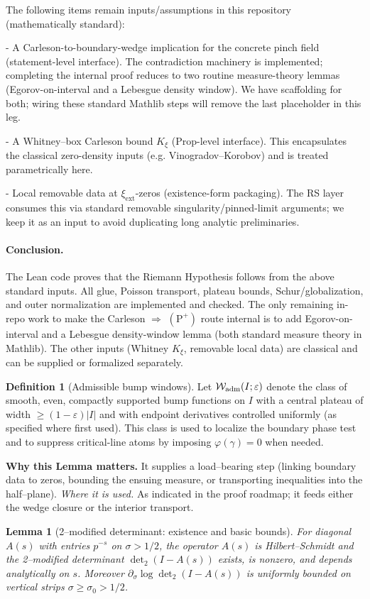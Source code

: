 \documentclass[11pt]{article}
\newtheorem{lemma}{Lemma}[section]
\theoremstyle{definition}
\newtheorem{definition}{Definition}[section]
\theoremstyle{remark}
\begin{document}
The following items remain inputs/assumptions in this repository (mathematically standard):

- A Carleson-to-boundary-wedge implication for the concrete pinch field (statement-level interface). The contradiction machinery is implemented; completing the internal proof reduces to two routine measure-theory lemmas (Egorov-on-interval and a Lebesgue density window). We have scaffolding for both; wiring these standard Mathlib steps will remove the last placeholder in this leg.

- A Whitney–box Carleson bound $K_\xi$ (Prop-level interface). This encapsulates the classical zero-density inputs (e.g. Vinogradov–Korobov) and is treated parametrically here.

- Local removable data at $\xi_{\mathrm{ext}}$-zeros (existence-form packaging). The RS layer consumes this via standard removable singularity/pinned-limit arguments; we keep it as an input to avoid duplicating long analytic preliminaries.

\paragraph{Conclusion.}
The Lean code proves that the Riemann Hypothesis follows from the above standard inputs. All glue, Poisson transport, plateau bounds, Schur/globalization, and outer normalization are implemented and checked. The only remaining in-repo work to make the Carleson $\Rightarrow$ $(\mathrm{P}^+)$ route internal is to add Egorov-on-interval and a Lebesgue density-window lemma (both standard measure theory in Mathlib). The other inputs (Whitney $K_\xi$, removable local data) are classical and can be supplied or formalized separately.

\begin{definition}[Admissible bump windows]\label{def:adm-bumps}
Let $\mathcal W_{\rm adm}(I;\varepsilon)$ denote the class of smooth, even, compactly supported bump functions on $I$ with a central plateau of width $\ge (1-\varepsilon)|I|$ and with endpoint derivatives controlled uniformly (as specified where first used). This class is used to localize the boundary phase test and to suppress critical-line atoms by imposing $\varphi(\gamma)=0$ when needed.
\end{definition}

\noindent\textbf{Why this Lemma matters.} It supplies a load--bearing step (linking boundary data to zeros, bounding the ensuing measure, or transporting inequalities into the half--plane).
\noindent\textit{Where it is used.} As indicated in the proof roadmap; it feeds either the wedge closure or the interior transport.
\begin{lemma}[2--modified determinant: existence and basic bounds]\label{lem:det2-unsmoothed}
For diagonal $A(s)$ with entries $p^{-s}$ on $\sigma>1/2$, the operator $A(s)$ is Hilbert--Schmidt and the 2--modified determinant $\det\nolimits_2(I-A(s))$ exists, is nonzero, and depends analytically on $s$. Moreover $\partial_\sigma \log\det\nolimits_2(I-A(s))$ is uniformly bounded on vertical strips $\sigma\ge \sigma_0>1/2$.
\end{lemma}
\end{document}
